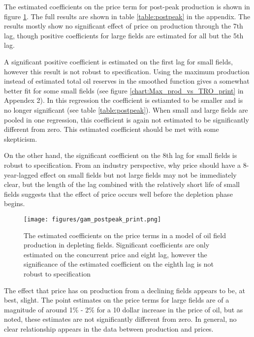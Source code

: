 \documentclass[12pt]{article}
\begin{document}
 The estimated coefficients on the price term for post-peak production is shown in figure \ref{gam_postpeak_print}.  The full results are shown in table \ref{table:postpeak} in the appendix.  The results mostly show no significant effect of price on production through the 7th lag, though positive coefficients for large fields are estimated for all but the 5th lag.  

 A significant positive coefficient is estimated on the first lag for small fields, however this result is not robust to specification.  Using the maximum production instead of estimated total oil reserves in the smoothed function gives a somewhat better fit for some small fields (see figure \ref{chart:Max_prod_vs_TRO_print} in Appendex 2).  In this regression the coefficient is estiamted to be smaller and is no longer significant (see table \ref{table:postpeak}).  When small and large fields are pooled in one regression, this coefficient is again not estimated to be significantly different from zero.  This estimated coefficient should be met with some skepticism.  

 On the other hand, the significant coefficient on the 8th lag for small fields is robust to specification. From an industry perspective, why price should have a 8-year-lagged effect on small fields but not large fields may not be immediately clear, but the length of the lag combined with the relatively short life of small fields suggests that the effect of price occurs well before the depletion phase begins.  

\begin{figure}
	\texttt{[image: figures/gam\_postpeak\_print.png]}
	\caption{The estimated coefficients on the price terms in a model of oil field production in depleting fields.  Significant coefficients are only estimated on the concurrent price and eight lag, however the significance of the estimated coefficient on the eighth lag is not robust to specification}
	\label{gam_postpeak_print}
\end{figure}

The effect that price has on production from a declining fields appears to be, at best, slight.  The point estimates on the price terms for large fields are of a magnitude of around 1\% - 2\% for a 10 dollar increase in the price of oil, but as noted, these estimates are not significantly different from zero.  In general, no clear relationship appears in the data between production and prices.
\end{document}
